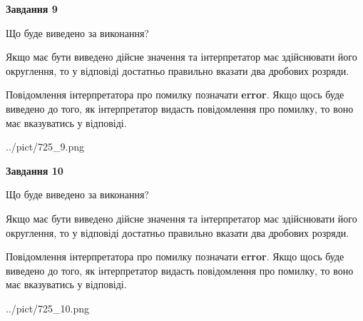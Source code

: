 \documentclass[12pt, ukrainian]{article}
\begin{document}
{\begin {Large}
{\begin {center}\textbf{Завдання 9}\end {center}}\par
Що буде виведено за виконання? \par

Якщо має бути виведено дійсне значення та інтерпретатор має здійснювати його округлення, 
то у відповіді достатньо правильно вказати два дробових розряди.

Повідомлення інтерпретатора про помилку позначати \textbf{error}.
Якщо щось буде виведено до того, як інтерпретатор видасть повідомлення про помилку, 
то воно має вказуватись у відповіді. \par

\begin{center}
	{../pict/725_9.png}
\end{center}
\newpage

{\begin {center}\textbf{Завдання 10}\end {center}}\par
Що буде виведено за виконання? \par

Якщо має бути виведено дійсне значення та інтерпретатор має здійснювати його округлення, 
то у відповіді достатньо правильно вказати два дробових розряди.

Повідомлення інтерпретатора про помилку позначати \textbf{error}.
Якщо щось буде виведено до того, як інтерпретатор видасть повідомлення про помилку, 
то воно має вказуватись у відповіді. \par

\begin{center}
	{../pict/725_10.png}
\end{center}
\newpage

\end {Large}}
\end{document}
